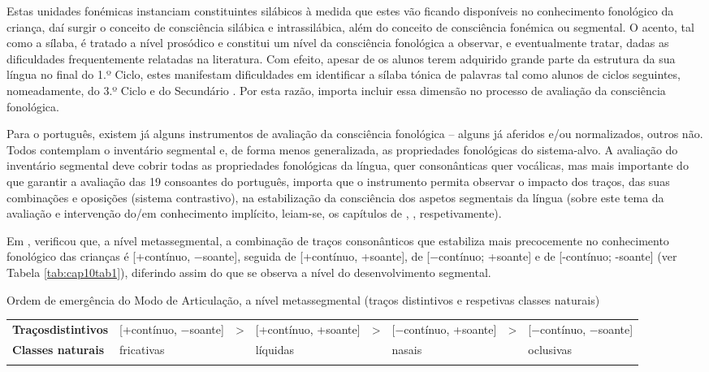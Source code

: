 \documentclass[output=paper,colorlinks,citecolor=brown,booklanguage=portuguese]{langscibook}
\begin{document}
Estas unidades fonémicas instanciam constituintes silábicos à medida que estes vão ficando disponíveis no conhecimento fonológico da criança, daí surgir o conceito de consciência silábica e intrassilábica, além do conceito de consciência fonémica ou segmental. O acento, tal como a sílaba, é tratado a nível prosódico e constitui um nível da consciência fonológica a observar, e eventualmente tratar, dadas as dificuldades frequentemente relatadas na literatura. Com efeito, apesar de os alunos terem adquirido grande parte da estrutura da sua língua no final do 1.º Ciclo, estes manifestam dificuldades em identificar a sílaba tónica de palavras \citep{Freitas2019} tal como alunos de ciclos seguintes, nomeadamente, do 3.º Ciclo e do Secundário \citep{Araujo2004}. Por esta razão, importa incluir essa dimensão no processo de avaliação da consciência fonológica.

Para o português, existem já alguns instrumentos de avaliação da consciência fonológica -- alguns já aferidos e/ou normalizados, outros não. Todos contemplam o inventário segmental e, de forma menos generalizada, as propriedades fonológicas do sistema-alvo. A avaliação do inventário segmental deve cobrir todas as propriedades fonológicas da língua, quer consonânticas quer vocálicas, mas mais importante do que garantir a avaliação das 19 consoantes do português, importa que o instrumento permita observar o impacto dos traços, das suas combinações e oposições (sistema contrastivo), na estabilização da consciência dos aspetos segmentais da língua (sobre este tema da avaliação e intervenção do/em conhecimento implícito, leiam-se, os capítulos de , , respetivamente).

Em \citeyear{Alves2012}, \citeauthor{Alves2012} verificou que, a nível metassegmental, a combinação de traços consonânticos que estabiliza mais precocemente no conhecimento fonológico das crianças é [+contínuo, $-$soante], seguida de [+contínuo, +soante], de [$-$contínuo; +soante] e de [-contínuo; -soante] (ver Tabela \ref{tab:cap10tab1}), diferindo assim do que se observa a nível do desenvolvimento segmental. 



\begin{Tabela}
\caption{Ordem de emergência do Modo de Articulação, a nível metassegmental (traços distintivos e respetivas classes naturais)}
\label{tab:cap10tab1}


\begin{tabularx}{\textwidth}{QQcQcQcQ}
\lsptoprule
\textbf{Traços}\newline \textbf{distintivos} & [+contínuo, $-$soante] &  & [+contínuo, +soante]  &  & [$-$contínuo, +soante]  &  & [$-$contínuo, $-$soante]  \\
\tablevspace
\textbf{Classes {naturais}} & fricativas & & líquidas && nasais &&  oclusivas\\
\lspbottomrule
\end{tabularx}
\end{Tabela}
\end{document}
